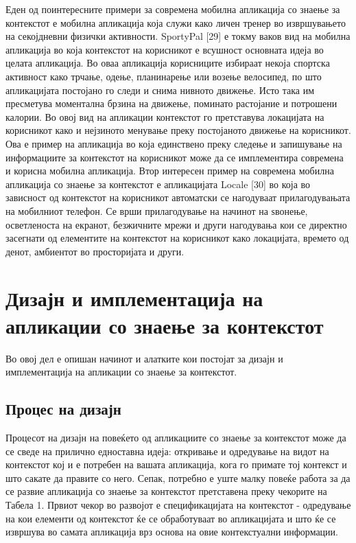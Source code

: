 Еден од поинтересните примери за современа мобилна апликација со знаење за
контекстот е мобилна апликација која служи како личен тренер во извршувањето на
секојдневни физички активности. SportyPal [29] е токму ваков вид на мобилна
апликација во која контекстот на корисникот е всушност основната идеја во целата
апликација. Во оваа апликација корисниците избираат некоја спортска активност
како трчање, одење, планинарење или возење велосипед, по што апликацијата
постојано го следи и снима нивното движење. Исто така им пресметува моментална
брзина на движење, поминато растојание и потрошени калории. Во овој вид на
апликации контекстот го претставува локацијата на корисникот како и нејзиното
менување преку постојаното движење на корисникот. Ова е пример на апликација во
која единствено преку следење и запишување на информациите за контекстот на
корисникот може да се имплементира современа и корисна мобилна апликација. Втор
интересен пример на современа мобилна апликација со знаење за контекстот е
апликацијата Locale [30] во која во зависност од контекстот на корисникот
автоматски се нагодуваат прилагодувањата на мобилниот телефон. Се врши
прилагодување на начинот на ѕвонење, осветленоста на екранот, безжичните мрежи и
други нагодувања кои се директно засегнати од елементите на контекстот на
корисникот како локацијата, времето од денот, амбиентот во просторијата и други.

\section{Дизајн и имплементација на апликации со знаење за контекстот}

Во овој дел е опишан начинот и алатките кои постојат за дизајн и имплементација
на апликации со знаење за контекстот.

\subsection{Процес на дизајн}

Процесот на дизајн на повеќето од апликациите со знаење за контекстот може да се
сведе на прилично едноставна идеја: откривање и одредување на видот на
контекстот кој и е потребен на вашата апликација, кога го примате тој контекст и
што сакате да правите со него. Сепак, потребно е уште малку повеќе работа за да
се развие апликација со знаење за контекстот претставена преку чекорите на
Табела 1. Првиот чекор во развојот е спецификацијата на контекстот - одредување
на кои елементи од контекстот ќе се обработуваат во апликацијата и што ќе се
извршува во самата апликација врз основа на овие контекстуални информации.

